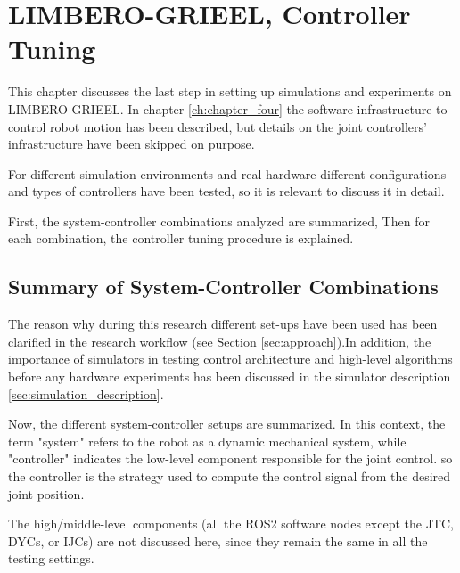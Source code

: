 \chapter{ LIMBERO-GRIEEL, Controller Tuning}
\label{ch:chapter_six}

This chapter discusses the last step in setting up simulations and experiments on LIMBERO-GRIEEL. 
In chapter \ref{ch:chapter_four} the software infrastructure to control robot motion has been described, but details on the joint controllers' infrastructure have been skipped on purpose.

For different simulation environments and real hardware different configurations and types of controllers have been tested, so it is relevant to discuss it in detail.

First, the system-controller combinations analyzed are summarized, Then for each combination, the controller tuning procedure is explained.

\section{Summary of System-Controller Combinations}
\label{sec:system_controller}

The reason why during this research different set-ups have been used has been clarified in the research workflow (see Section \ref{sec:approach}).In addition, the importance of simulators in testing control architecture and high-level algorithms before any hardware experiments has been discussed in the simulator description \ref{sec:simulation_description}.

Now, the different system-controller setups are summarized. 
In this context, the term "system" refers to the robot as a dynamic mechanical system, while "controller" indicates the low-level component responsible for the joint control. so the controller is the strategy used to compute the control signal from the desired joint position.

The high/middle-level components (all the ROS2 software nodes except the JTC, DYCs, or IJCs) are not discussed here, since they remain the same in all the testing settings. 

